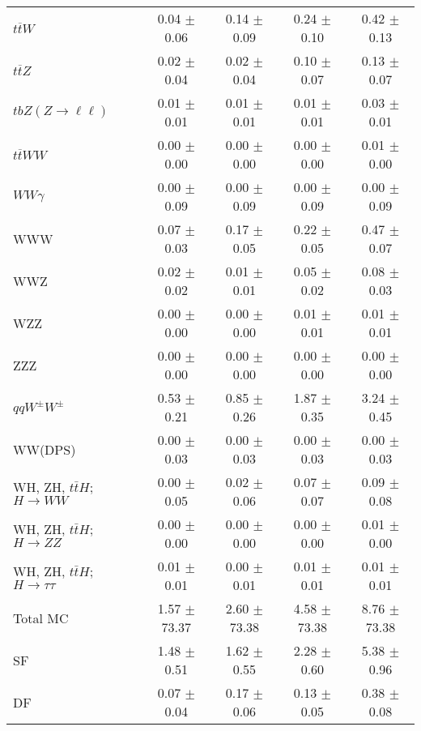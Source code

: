 \begin{tabular}{l|cccc}
                   $t\overline{t}W$ &  0.04 $\pm$  0.06 &  0.14 $\pm$  0.09 &  0.24 $\pm$  0.10 &  0.42 $\pm$  0.13 \\
                   $t\overline{t}Z$ &  0.02 $\pm$  0.04 &  0.02 $\pm$  0.04 &  0.10 $\pm$  0.07 &  0.13 $\pm$  0.07 \\
    $tbZ (Z \rightarrow \ell \ell)$ &  0.01 $\pm$  0.01 &  0.01 $\pm$  0.01 &  0.01 $\pm$  0.01 &  0.03 $\pm$  0.01 \\
                  $t\overline{t}WW$ &  0.00 $\pm$  0.00 &  0.00 $\pm$  0.00 &  0.00 $\pm$  0.00 &  0.01 $\pm$  0.00 \\
                         $WW\gamma$ &  0.00 $\pm$  0.09 &  0.00 $\pm$  0.09 &  0.00 $\pm$  0.09 &  0.00 $\pm$  0.09 \\
                                WWW &  0.07 $\pm$  0.03 &  0.17 $\pm$  0.05 &  0.22 $\pm$  0.05 &  0.47 $\pm$  0.07 \\
                                WWZ &  0.02 $\pm$  0.02 &  0.01 $\pm$  0.01 &  0.05 $\pm$  0.02 &  0.08 $\pm$  0.03 \\
                                WZZ &  0.00 $\pm$  0.00 &  0.00 $\pm$  0.00 &  0.01 $\pm$  0.01 &  0.01 $\pm$  0.01 \\
                                ZZZ &  0.00 $\pm$  0.00 &  0.00 $\pm$  0.00 &  0.00 $\pm$  0.00 &  0.00 $\pm$  0.00 \\
                 $qqW^{\pm}W^{\pm}$ &  0.53 $\pm$  0.21 &  0.85 $\pm$  0.26 &  1.87 $\pm$  0.35 &  3.24 $\pm$  0.45 \\
                            WW(DPS) &  0.00 $\pm$  0.03 &  0.00 $\pm$  0.03 &  0.00 $\pm$  0.03 &  0.00 $\pm$  0.03 \\
WH, ZH, $t\bar{t}H$; $H \rightarrow WW$ &  0.00 $\pm$  0.05 &  0.02 $\pm$  0.06 &  0.07 $\pm$  0.07 &  0.09 $\pm$  0.08 \\
WH, ZH, $t\bar{t}H$; $H \rightarrow ZZ$ &  0.00 $\pm$  0.00 &  0.00 $\pm$  0.00 &  0.00 $\pm$  0.00 &  0.01 $\pm$  0.00 \\
WH, ZH, $t\bar{t}H$; $H \rightarrow \tau\tau$ &  0.01 $\pm$  0.01 &  0.00 $\pm$  0.01 &  0.01 $\pm$  0.01 &  0.01 $\pm$  0.01 \\
\hline\hline
                           Total MC &  1.57 $\pm$ 73.37 &  2.60 $\pm$ 73.38 &  4.58 $\pm$ 73.38 &  8.76 $\pm$ 73.38 \\
\hline
                                 SF &  1.48 $\pm$  0.51 &  1.62 $\pm$  0.55 &  2.28 $\pm$  0.60 &  5.38 $\pm$  0.96 \\
                                 DF &  0.07 $\pm$  0.04 &  0.17 $\pm$  0.06 &  0.13 $\pm$  0.05 &  0.38 $\pm$  0.08 \\

\end{tabular}
